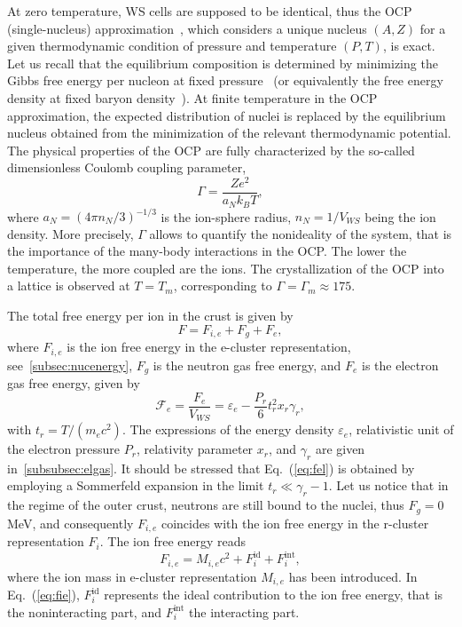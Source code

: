 At zero temperature, WS cells are supposed to be identical, thus the OCP  
(single-nucleus) approximation~\cite{Baus1980}, which considers a unique 
nucleus $(A,Z)$ for a given thermodynamic condition of pressure and temperature 
$(P,T)$, is exact. Let us recall that the equilibrium composition is 
determined by minimizing the Gibbs free energy per nucleon at fixed
pressure~\cite{Fantina2020} 
(or equivalently the free energy density at fixed baryon
density~\cite{Lattimer1991,Gulminelli2015,Carreau2019}).
At finite temperature in the OCP approximation, the expected distribution of 
nuclei is replaced by the equilibrium nucleus obtained from the minimization of 
the relevant thermodynamic potential.
The physical properties of the OCP are fully characterized by the so-called 
dimensionless Coulomb coupling parameter,
%
\begin{equation}
  \Gamma = \frac{Ze^2}{a_N k_B T},\label{eq:gamma}
\end{equation}
%
where $a_N=(4\pi n_N/3)^{-1/3}$ is the ion-sphere radius, $n_N=1/V_{WS}$ being 
the ion density.
More precisely, $\Gamma$ allows to quantify the nonideality of the system, that
is the importance of the many-body interactions in the OCP. The lower the
temperature, the more coupled are the ions. The crystallization of the OCP into 
a lattice is observed at $T=T_m$, corresponding to 
$\Gamma = \Gamma_m \approx 175$.

The total free energy per ion in the crust is given by
%
\begin{equation}
  F = F_{i,e} + F_g + F_e,\label{eq:fperion}
\end{equation}
%
where $F_{i,e}$ is the ion free energy in the e-cluster representation, 
see~\ref{subsec:nucenergy}, $F_g$ is the neutron gas free energy, and $F_e$ 
is the electron gas free energy, given by~\cite{Haensel2007}
%
\begin{equation}
  \mathcal{F}_e = \frac{F_e}{V_{WS}} = \varepsilon_e -
  \frac{P_r}{6}t_r^2x_r\gamma_r,\label{eq:fel}
\end{equation}
%
with $t_r = T/(m_e c^2)$. The expressions of the energy density 
$\varepsilon_e$, relativistic unit of the electron pressure $P_r$, relativity
parameter $x_r$, and $\gamma_r$ are given in~\ref{subsubsec:elgas}. It should
be stressed that Eq.~(\ref{eq:fel}) is obtained by employing a Sommerfeld
expansion in the limit $t_r \ll \gamma_r - 1$.
Let us notice that in the regime of the outer crust, neutrons are still bound
to the nuclei, thus $F_g=0$ MeV, and consequently $F_{i,e}$ coincides with the 
ion free energy in the r-cluster representation $F_i$.
The ion free energy reads
%
\begin{equation}
  F_{i,e} = M_{i,e} c^2 + F_i^{\text{id}} + F_i^{\text{int}},\label{eq:fie}
\end{equation}
%
where the ion mass in e-cluster representation $M_{i,e}$ has been introduced.
In Eq.~(\ref{eq:fie}), $F_i^{\text{id}}$ represents the ideal contribution to
the ion free energy, that is the noninteracting part, and $F_i^{\text{int}}$
the interacting part.

